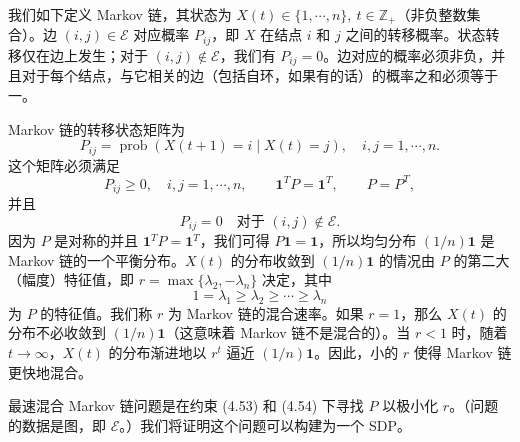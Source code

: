\documentclass[UTF8,12pt,a4paper,fontset=fandol]{ctexart}
\begin{document}
我们如下定义 Markov 链，其状态为 $X(t)\in\{1,\cdots,n\},\ t\in\mathbb{Z}_+$（非负整数集合）。边 $(i,j)\in\mathcal{E}$ 对应概率 $P_{ij}$，即 $X$ 在结点 $i$ 和 $j$ 之间的转移概率。状态转移仅在边上发生；对于 $(i,j)\notin\mathcal{E}$，我们有 $P_{ij}=0$。边对应的概率必须非负，并且对于每个结点，与它相关的边（包括自环，如果有的话）的概率之和必须等于一。

Markov 链的转移状态矩阵为
\[
P_{ij}=\operatorname{prob}(X(t+1)=i\mid X(t)=j),\quad i,j=1,\cdots,n.
\]
这个矩阵必须满足
\begin{equation}
P_{ij}\geq 0,\quad i,j=1,\cdots,n,\qquad \mathbf{1}^TP=\mathbf{1}^T,\qquad P=P^T,
\tag{4.53}
\end{equation}
并且
\begin{equation}
P_{ij}=0\quad \text{对于 }(i,j)\notin\mathcal{E}.
\tag{4.54}
\end{equation}
因为 $P$ 是对称的并且 $\mathbf{1}^TP=\mathbf{1}^T$，我们可得 $P\mathbf{1}=\mathbf{1}$，所以均匀分布 $(1/n)\mathbf{1}$ 是 Markov 链的一个平衡分布。$X(t)$ 的分布收敛到 $(1/n)\mathbf{1}$ 的情况由 $P$ 的第二大（幅度）特征值，即 $r=\max\{\lambda_2,-\lambda_n\}$ 决定，其中
\[
1=\lambda_1\geq \lambda_2\geq\cdots\geq \lambda_n
\]
为 $P$ 的特征值。我们称 $r$ 为 Markov 链的混合速率。如果 $r=1$，那么 $X(t)$ 的分布不必收敛到 $(1/n)\mathbf{1}$（这意味着 Markov 链不是混合的）。当 $r<1$ 时，随着 $t\to\infty$，$X(t)$ 的分布渐进地以 $r^t$ 逼近 $(1/n)\mathbf{1}$。因此，小的 $r$ 使得 Markov 链更快地混合。

最速混合 Markov 链问题是在约束 (4.53) 和 (4.54) 下寻找 $P$ 以极小化 $r$。（问题的数据是图，即 $\mathcal{E}$。）我们将证明这个问题可以构建为一个 SDP。
\end{document}

